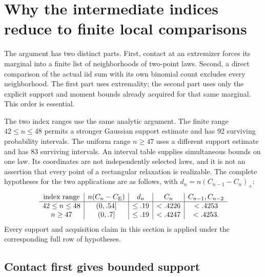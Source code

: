 \section{Why the intermediate indices reduce to finite local comparisons}
\label{ext:local-engine}

The argument has two distinct parts. First, contact at an extremizer
forces its marginal into a finite list of neighborhoods of two-point
laws. Second, a direct comparison of the actual iid sum with its own
binomial count excludes every neighborhood. The first part uses
extremality; the second part uses only the explicit support and moment
bounds already acquired for that same marginal. This order is essential.

The two index ranges use the same analytic argument. The finite range
$42\le n\le48$ permits a stronger Gaussian support estimate and has
92 surviving probability intervals. The uniform range $n\ge47$ uses a
different support estimate and has 83 surviving intervals. An interval
table supplies simultaneous bounds on one law. Its coordinates are not
independently selected laws, and it is not an assertion that every
point of a rectangular relaxation is realizable. The complete hypotheses
for the two applications are as follows, with
$d_n=n(C_{n-1}-C_n)_+$:
\[
\begin{array}{c|c|c|c|c}
 \text{index range}&n(C_n-C_{\mathrm E})&d_n&C_n&C_{n-1},C_{n-2}\\\hline
 42\le n\le48&(0,.54]&\le.19&<.4226&<.4253\\
 n\ge47&(0,.7]&\le.19&<.4247&<.4253.
\end{array}
\]
Every support and acquisition claim in this section is applied under
the corresponding full row of hypotheses.

\subsection{Contact first gives bounded support}

